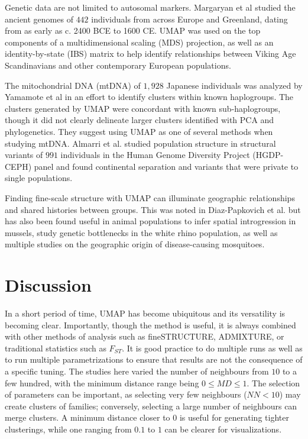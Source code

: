 \documentclass[12pt]{article}
\begin{document}
Genetic data are not limited to autosomal markers. Margaryan et al\cite{margaryan_population_2019} studied the ancient genomes of $442$ individuals from across Europe and Greenland, dating from as early as c. 2400 BCE to 1600 CE. UMAP was used on the top components of a multidimensional scaling (MDS) projection, as well as an identity-by-state (IBS) matrix to help identify relationships between Viking Age Scandinavians and other contemporary European populations. 

The mitochondrial DNA (mtDNA) of $1,928$ Japanese individuals was analyzed by Yamamote et al in an effort to identify clusters within known haplogroups\cite{yamamoto_genetic_2020}. The clusters generated by UMAP were concordant with known sub-haplogroups, though it did not clearly delineate larger clusters identified with PCA and phylogenetics. They suggest using UMAP as one of several methods when studying mtDNA. Almarri et al.\cite{almarri_population_2020} studied population structure in structural variants of $991$ individuals in the Human Genome Diversity Project (HGDP-CEPH) panel and found continental separation and variants that were private to single populations.

Finding fine-scale structure with UMAP can illuminate geographic relationships and shared histories between groups. This was noted in Diaz-Papkovich et al.\cite{diaz-papkovich_umap_2019} but has also been found useful in animal populations to infer spatial introgression in mussels\cite{simon_local_2019}, study genetic bottlenecks in the white rhino population\cite{sanchez-barreiro_historical_2020}, as well as multiple studies on the geographic origin of disease-causing mosquitoes\cite{consortium_genome_2020}\cite{schmidt_population_2020}.

\section*{Discussion}
In a short period of time, UMAP has become ubiquitous and its versatility is becoming clear. Importantly, though the method is useful, it is always combined with other methods of analysis such as fineSTRUCTURE\cite{lawson2012inference}, ADMIXTURE\cite{alexander2009fast}, or traditional statistics such as $F_{ST}$. It is good practice to do multiple runs as well as to run multiple parametrizations to ensure that results are not the consequence of a specific tuning. The studies here varied the number of neighbours from $10$ to a few hundred, with the minimum distance range being $0 \le MD \le 1$. The selection of parameters can be important, as selecting very few neighbours ($ NN < 10$) may create clusters of families; conversely, selecting a large number of neighbours can merge clusters. A minimum distance closer to $0$ is useful for generating tighter clusterings, while one ranging from $0.1$ to $1$ can be clearer for visualizations.
\end{document}
